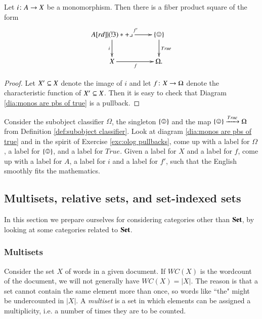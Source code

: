 \begin{corollary}\label{cor:monos are pullbacks of true}

Let $i\taking A\to X$ be a monomorphism. Then there is a fiber product square of the form 
\begin{align}\label{dia:monos are pbs of true}
\xymatrix{A\ar[r]^{f'}\ar[d]_i\ullimit&\singleton\ar[d]^{True}\\X\ar[r]_f&\Omega.}
\end{align}

\end{corollary}

\begin{proof}

Let $X'\ss X$ denote the image of $i$ and let $f\taking X\to\Omega$ denote the characteristic function of $X'\ss X$. Then it is easy to check that Diagram \ref{dia:monos are pbs of true} is a pullback.

\end{proof}

\begin{exercise}
Consider the subobject classifier $\Omega$, the singleton $\singleton$ and the map $\singleton\To{True}\Omega$ from Definition \ref{def:subobject classifier}. Look at diagram \ref{dia:monos are pbs of true} and in the spirit of Exercise \ref{exc:olog pullbacks}, come up with a label for $\Omega$, a label for $\singleton$, and a label for $True$. Given a label for $X$ and a label for $f$, come up with a label for $A$, a label for $i$ and a label for $f'$, such that the English smoothly fits the mathematics.
\end{exercise}


\subsection{Multisets, relative sets, and set-indexed sets}

In this section we prepare ourselves for considering categories other than $\Set$, by looking at some categories related to $\Set$. 


\subsubsection{Multisets}

Consider the set $X$ of words in a given document. If $WC(X)$ is the wordcount of the document, we will not generally have $WC(X)=|X|$. The reason is that a set cannot contain the same element more than once, so words like ``the" might be undercounted in $|X|$. A {\em multiset} is a set in which elements can be assigned a multiplicity, i.e. a number of times they are to be counted. 

